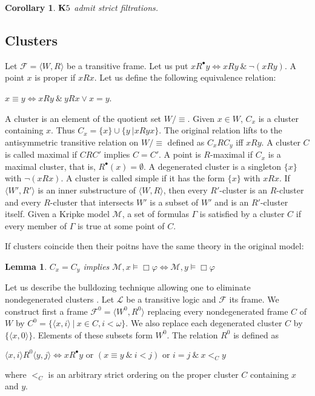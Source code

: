 \documentclass[a4paper]{article}
\theoremstyle{defin}
\theoremstyle{theorem}
\theoremstyle{prop}
\theoremstyle{lemma}
\newtheorem{lemma}{Lemma}
\theoremstyle{ex}
\theoremstyle{col}
\newtheorem{col}{Corollary}
\begin{document}
\begin{col}
  ${\bf K}5$ admit strict filtrations.
\end{col}

\subsection{Clusters}

Let $\mathcal{F} = \langle W, R \rangle$ be a transitive frame.
Let us put $x R^{\bullet} y \Leftrightarrow x R y \: \& \: \neg (x R y)$. A point $x$ is proper if $x R x$. Let us define the following
equivalence relation:

\begin{center}
  $x \equiv y \Leftrightarrow x R y \: \& \: y R x \lor x = y$.
\end{center}
A cluster is an element of the quotient set $W / \equiv$. Given $x \in W$, $C_x$ is a cluster containing $x$. Thus $C_x =
\{ x\} \cup \{ y \: | x R y x \}$. The original relation lifts to the antisymmetric transitive relation on $W / \equiv$ defined as
$C_x R C_y$ iff $x R y$. A cluster $C$ is called maximal if $C R C'$ implies $C = C'$. A point is $R$-maximal if $C_x$ is a maximal cluster,
that is, $R^{\bullet}(x) = \emptyset$. A degenerated cluster is a singleton $\{ x \}$ with $\neg (x R x)$. A cluster is called simple if it has the form $\{ x \}$ with $x R x$. If $\langle W', R' \rangle$ is an inner substructure of $\langle W, R \rangle$, then every $R'$-cluster is an $R$-cluster and every $R$-cluster that intersects $W'$ is a subset of $W'$ and is an $R'$-cluster itself. Given a Kripke model $\mathcal{M}$, a set of formulas $\Gamma$ is satisfied by a cluster $C$ if every member of $\Gamma$ is true at some point of $C$.

If clusters coincide then their poitns have the same theory in the original model:

\begin{lemma}
  $C_x = C_y$ implies $\mathcal{M}, x \models \Box \varphi \Leftrightarrow \mathcal{M}, y \models \Box \varphi$
\end{lemma}

Let us describe the bulldozing technique allowing one to eliminate nondegenerated clusters \cite{bull1984basic}. Let $\mathcal{L}$ be a transitive logic and $\mathcal{F}$ its frame. We construct first a frame $\mathcal{F}^0 = \langle W^{0}, R^{0} \rangle$ replacing every nondegenerated frame $C$ of $W$ by $C^0 = \{ \langle x, i \rangle \: | \: x \in C, i < \omega \}$. We also replace each degenerated cluster $C$ by $\{ \langle x,0 \rangle\}$.
Elements of these subsets form $W^0$. The relation $R^{0}$ is defined as
\begin{center}
  $\langle x, i \rangle R^{0} \langle y, j \rangle \Leftrightarrow x R^{\bullet} y \text{ or } (x \equiv y \: \& \: i < j) \text{ or } i = j \: \& \: x <_C y$
\end{center}
where $<_C$ is an arbitrary strict ordering on the proper cluster $C$ containing $x$ and $y$.
\end{document}
